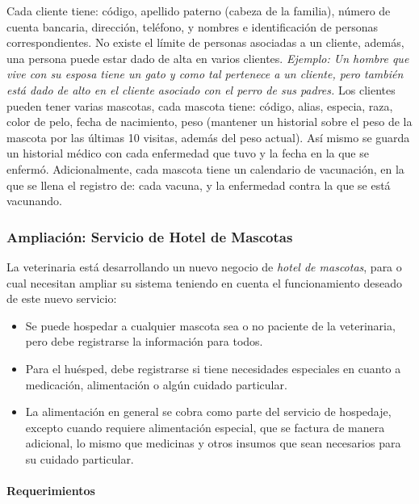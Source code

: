 \documentclass[
  12pt,
  hidelinks,
  a4paper,
  headings=standardclasses,
  headings=big,
  spanish
]{scrartcl}
\begin{document}
Cada cliente tiene: código, apellido paterno (cabeza de la familia), número de cuenta bancaria, dirección, teléfono, y nombres e identificación de personas correspondientes.
No existe el límite de personas asociadas a un cliente, además, una persona puede estar dado de alta en varios clientes.
\emph{Ejemplo: Un hombre que vive con su esposa tiene un gato y como tal pertenece a un cliente, pero también está dado de alto en el cliente asociado con el perro de sus padres.}
Los clientes pueden tener varias mascotas, cada mascota tiene: código, alias, especia, raza, color de pelo, fecha de nacimiento, peso (mantener un historial sobre el peso de la mascota por las últimas 10 visitas, además del peso actual).
Así mismo se guarda un historial médico con cada enfermedad que tuvo y la fecha en la que se enfermó.
Adicionalmente, cada mascota tiene un calendario de vacunación, en la que se llena el registro de: cada vacuna, y la enfermedad contra la que se está vacunando.

\subsubsection{Ampliación: Servicio de Hotel de Mascotas}

La veterinaria está desarrollando un nuevo negocio de \emph{hotel de mascotas}, para o cual necesitan ampliar su sistema teniendo en cuenta el funcionamiento deseado de este nuevo servicio:

\begin{itemize}
  \item Se puede hospedar a cualquier mascota sea o no paciente de la veterinaria, pero debe registrarse la información para todos.
  \item Para el huésped, debe registrarse si tiene necesidades especiales en cuanto a medicación, alimentación o algún cuidado particular.
  \item La alimentación en general se cobra como parte del servicio de hospedaje, excepto cuando requiere alimentación especial, que se factura de manera adicional, lo mismo que medicinas y otros insumos que sean necesarios para su cuidado particular.
\end{itemize}

\paragraph{Requerimientos}
\end{document}
